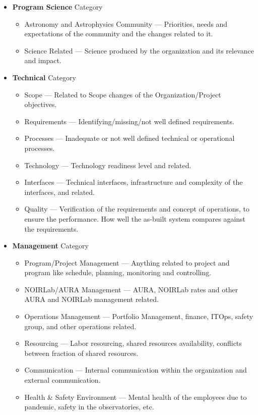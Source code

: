 \begin{itemize}
	\item \textbf{Program Science} Category
		\begin{itemize}
			\item Astronomy and Astrophysics Community --- Priorities, needs and expectations of the community and the changes related to it.
			\item Science Related --- Science produced by the organization and its relevance and impact.
		\end{itemize}
	\item \textbf{Technical} Category
		\begin{itemize}
			\item Scope --- Related to Scope changes of the Organization/Project objectives.
			\item Requirements --- Identifying/missing/not well defined requirements.
			\item Processes --- Inadequate or not well defined technical or operational processes.
			\item Technology --- Technology readiness level and related.
			\item Interfaces --- Technical interfaces, infrastructure and complexity of the interfaces, and related.
			\item Quality --- Verification of the requirements and concept of operations, to ensure the performance. How well the as-built system compares against the requirements.
		\end{itemize}
	\item \textbf{Management} Category
		\begin{itemize}
			\item Program/Project Management --- Anything related to project and program like schedule, planning, monitoring and controlling.
			\item NOIRLab/AURA Management --- AURA, NOIRLab rates and other AURA and NOIRLab management related.
			\item Operations Management --- Portfolio Management, finance, ITOps, safety group, and other operations related.
			\item Resourcing --- Labor resourcing, shared resources availability, conflicts between fraction of shared resources.
			\item Communication --- Internal communication within the organization and external communication.
			\item Health \& Safety Environment --- Mental health of the employees due to pandemic, safety in the observatories, etc.

\end{itemize}
\end{itemize}
